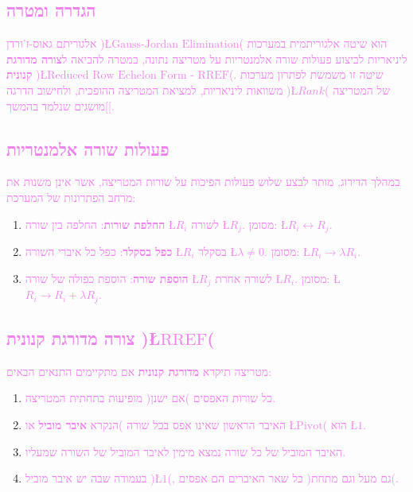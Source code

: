 \documentclass[english,hebrew]{article}
\begin{document}
\subsection*{\textcolor{violet}{הגדרה ומטרה}}

\textcolor{violet}{אלגוריתם גאוס-ז'ורדן )\L{$\text{Gauss-Jordan Elimination}$}(
הוא שיטה אלגוריתמית במערכות ליניאריות לביצוע פעולות שורה אלמנטריות
על מטריצה נתונה, במטרה להביאה ל}\textbf{\textcolor{violet}{צורה מדורגת
קנונית}}\textcolor{violet}{{} )\L{$\text{Reduced Row Echelon Form - RREF}$}(.
שיטה זו משמשת לפתרון מערכות משוואות ליניאריות, למציאת המטריצה ההופכית,
ולחישוב הדרגה )\L{$Rank$}( של המטריצה {]}מושגים שנלמד בהמשך{[}.}

\subsection*{\textcolor{violet}{פעולות שורה אלמנטריות}}

\textcolor{violet}{במהלך הדירוג, מותר לבצע שלוש פעולות הפיכות על שורות
המטריצה, אשר אינן משנות את מרחב הפתרונות של המערכת: }
\begin{enumerate}
\item \textbf{\textcolor{violet}{החלפת שורות}}\textcolor{violet}{: החלפה
בין שורה \L{$R_{i}$} לשורה \L{$R_{j}$}. מסומן: \L{$R_{i}\leftrightarrow R_{j}$}. }
\item \textbf{\textcolor{violet}{כפל בסקלר}}\textcolor{violet}{: כפל כל
איברי השורה \L{$R_{i}$} בסקלר \L{$\lambda\neq0$}. מסומן: \L{$R_{i}\to\lambda R_{i}$}. }
\item \textbf{\textcolor{violet}{הוספת שורה}}\textcolor{violet}{: הוספת
כפולה של שורה \L{$R_{j}$} לשורה אחרת \L{$R_{i}$}. מסומן: \L{$R_{i}\to R_{i}+\lambda R_{j}$}. }
\end{enumerate}

\subsection*{\textcolor{violet}{צורה מדורגת קנונית )\L{$\text{RREF}$}(}}

\textcolor{violet}{מטריצה תיקרא }\textbf{\textcolor{violet}{מדורגת
קנונית}}\textcolor{violet}{{} אם מתקיימים התנאים הבאים: }
\begin{enumerate}
\item \textcolor{violet}{כל שורות האפסים )אם ישנן( מופיעות בתחתית המטריצה. }
\item \textcolor{violet}{האיבר הראשון שאינו אפס בכל שורה )הנקרא }\textbf{\textcolor{violet}{איבר
מוביל}}\textcolor{violet}{{} או \L{$\text{Pivot}$}( הוא \L{$1$}. }
\item \textcolor{violet}{האיבר המוביל של כל שורה נמצא מימין לאיבר המוביל
של השורה שמעליו. }
\item \textcolor{violet}{בעמודה שבה יש איבר מוביל )\L{$1$}(, כל שאר האיברים
הם אפסים )גם מעל וגם מתחת(. }
\end{enumerate}
\end{document}
